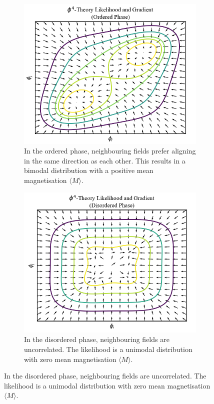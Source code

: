\documentclass[11pt]{article}
\begin{document}
    \begin{figure}[h!]
        \centering
        \begin{subfigure}{\linewidth}
            \centering
            \includegraphics[width=\linewidth]{../figures/Phi4LikelihoodOrdered}
            \caption{
            In the ordered phase, neighbouring fields prefer aligning in the same direction as each other.
            This results in a bimodal distribution with a positive mean magnetisation $\langle M \rangle$.}
            \label{fig:phi4likelihood_ordered}
        \end{subfigure}
        \begin{subfigure}{\linewidth}
            \centering
            \includegraphics[width=\linewidth]{../figures/Phi4LikelihoodDisordered}
            \caption{
            In the disordered phase, neighbouring fields are uncorrelated. The likelihood is a unimodal distribution
            with zero mean magnetisation $\langle M \rangle$.}
            \label{fig:phi4likelihood_disordered}
        \end{subfigure}
    \end{figure}
\end{document}
